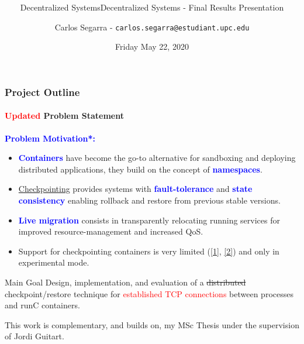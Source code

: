\documentclass[9pt,    %
    english,            %
    xcolor=table,       %
    envcountsect,        %
    aspectratio=169     %
]{beamer}
\subtitle{Decentralized Systems} %
\title[C/R of Established TCP Connections] %
    {\Large \mainTitle \\ \normalsize \secondTitle}
\subtitle{Decentralized Systems - Final Results Presentation} %
\date[May 22, 2020] %
    {Friday May 22, 2020}
\author[] %
{Carlos Segarra - \texttt{carlos.segarra@estudiant.upc.edu}}
\begin{document}
\begin{frame}
  \titlepage
\end{frame}

\begin{frame}
    \frametitle{Project Outline}
    \framesubtitle{\textcolor{red}{Updated} Problem Statement}


    \textbf{\textcolor{blue}{Problem Motivation*:}}
    \begin{itemize}
        \item \textbf{\textcolor{blue}{Containers}} have become the go-to alternative for sandboxing and deploying distributed applications, they build on the concept of \textbf{\textcolor{blue}{namespaces}}.
        \item \href{https://en.wikipedia.org/wiki/Application_checkpointing}{Checkpointing} provides systems with \textbf{\textcolor{blue}{fault-tolerance}} and \textbf{\textcolor{blue}{state consistency}} enabling rollback and restore from previous stable versions.
        \item \textbf{\textcolor{blue}{Live migration}} consists in transparently relocating running services for improved resource-management and increased QoS.
        \item Support for checkpointing containers is very limited (\href{https://github.com/docker/cli/blob/master/experimental/checkpoint-restore.md}{[1]}, \href{https://criu.org/Docker}{[2]}) and only in experimental mode. 
    \end{itemize}

    \begin{alertblock}{Main Goal}
        Design, implementation, and evaluation of a \sout{distributed} checkpoint/restore technique for \textcolor{red}{established TCP connections} between processes and runC containers.
    \end{alertblock}

    \vspace{1pt}
    \small
    \begin{description}
        \item *This work is complementary, and builds on, my MSc Thesis under the supervision of Jordi Guitart.
    \end{description}
\end{frame}
\end{document}

